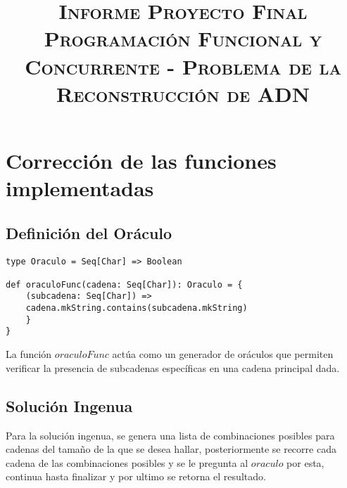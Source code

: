 \documentclass[conference]{IEEEtran}
\begin{document}
\title{\huge \textsc{Informe Proyecto Final Programación Funcional y Concurrente - Problema de la Reconstrucción de ADN}\\
}

\author{
\and
{}
}

\maketitle




\section{\textbf{Corrección de las funciones implementadas}}


\subsection{\textbf{Definición del Oráculo}}
\begin{lstlisting}
type Oraculo = Seq[Char] => Boolean

def oraculoFunc(cadena: Seq[Char]): Oraculo = {
    (subcadena: Seq[Char]) => 
    cadena.mkString.contains(subcadena.mkString)
    }
}
\end{lstlisting}

La función $oraculoFunc$ actúa como un generador de oráculos que permiten verificar la presencia de subcadenas específicas en una cadena principal dada.

\subsection{\textbf{Solución Ingenua}}

Para la solución ingenua, se genera una lista de combinaciones posibles para cadenas del tamaño de la que se desea hallar, posteriormente se recorre cada cadena de las combinaciones posibles y se le pregunta al $oraculo$ por esta, continua hasta finalizar y por ultimo se retorna el resultado.
\end{document}
